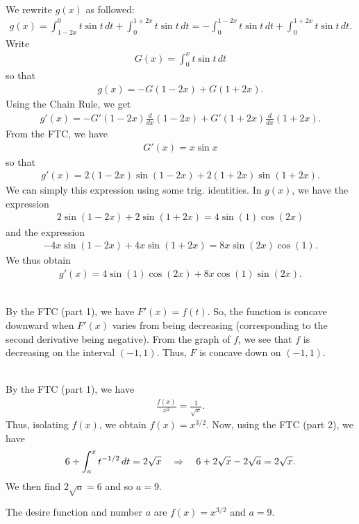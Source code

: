 	\\
	We rewrite $g(x)$ as followed:
		\begin{align*}
		g(x) = \int_{1 - 2x}^0 t \sin t \, dt + \int_0^{1 + 2x} t \sin t \, dt = -\int_0^{1- 2x} t \sin t \, dt + \int_0^{1 + 2x} t \sin t \, dt .
		\end{align*}		
	Write
		\begin{align*}
		G(x) = \int_0^x t \sin t \, dt
		\end{align*}
	so that
		\begin{align*}
		g(x) = -G(1 - 2x) + G(1 + 2x) .
		\end{align*}				
	Using the Chain Rule, we get
		\begin{align*}
		g'(x) = -G'(1 - 2x) \frac{d}{dx} (1 - 2x) + G'(1 + 2x) \frac{d}{dx} (1 + 2x) .
		\end{align*}
	From the FTC, we have
		\begin{align*}
		G'(x) = x \sin x
		\end{align*}
	so that
		\begin{align*}
		g'(x) = 2(1 - 2x) \sin (1 - 2x) + 2 (1 + 2x) \sin (1 + 2x) .
		\end{align*}
	We can simply this expression using some trig. identities. In $g(x)$, we have the expression
		\begin{align*}
		2 \sin (1 - 2x) + 2 \sin (1 + 2x ) = 4 \sin (1) \cos (2x ) 
		\end{align*}
	and the expression
		\begin{align*}
		-4x \sin (1 - 2x ) + 4x \sin (1 + 2x ) = 8x \sin (2x) \cos (1) .
		\end{align*}
	We thus obtain
		\begin{align*}
		g'(x) = 4 \sin (1) \cos (2x) + 8x \cos (1) \sin (2x ) .
		\end{align*}
		
	\spc
	
	\\
	By the FTC (part 1), we have $F'(x) = f(t)$. So, the function is concave downward when $F'(x)$ varies from being decreasing (corresponding to the second derivative being negative). From the graph of $f$, we see that $f$ is decreasing on the interval $(-1, 1)$. Thus, $F$ is concave down on $(-1, 1)$.
	
	\spc
	
	\\
	By the FTC (part 1), we have
		\begin{align*}
		\frac{f(x)}{x^2} = \frac{1}{\sqrt{x}} .
		\end{align*}
	Thus, isolating $f(x)$, we obtain $f(x) = x^{3/2}$. Now, using the FTC (part 2), we have
		\begin{align*}
		6 + \int_a^x t^{-1/2} \, dt = 2 \sqrt{x} \quad \Rightarrow \quad 6 + 2 \sqrt{x} - 2 \sqrt{a} = 2 \sqrt{x} .
		\end{align*}
	We then find $2 \sqrt{a} = 6$ and so $a = 9$. 
	
	The desire function and number $a$ are $f(x) = x^{3/2}$ and $a = 9$. 
	

